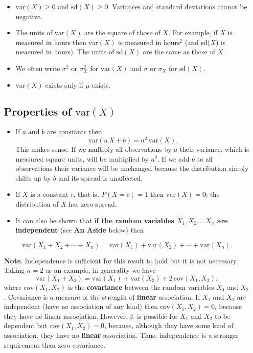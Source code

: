 \documentclass[
  british,
  11pt,
  openany, a4paper]{book}
\providecommand{\tightlist}{%
  \setlength{\itemsep}{0pt}\setlength{\parskip}{0pt}}
\begin{document}
\begin{itemize}
\tightlist
\item
  \(\mathrm{var}(X) \geq 0\) and \(\mathrm{sd}(X) \geq 0\). Variances and standard deviations cannot be negative.\\
\item
  The units of \(\mathrm{var}(X)\) are the square of those of \(X\). For example, if \(X\) is measured in hours then \(\mathrm{var}(X)\) is measured in hours\(^2\) (and sd(\(X\)) is measured in hours). The units of \(\mathrm{sd}(X)\) are the same as those of \(X\).
\item
  We often write \(\sigma^2\) or \(\sigma_X^2\) for \(\mathrm{var}(X)\) and
  \(\sigma\) or \(\sigma_X\) for \(\mathrm{sd}(X)\).
\item
  \(\mathrm{var}(X)\) exists only if \(\mu\) exists.
\end{itemize}

\subsection{\texorpdfstring{Properties of \(\mathrm{var}(X)\)}{Properties of \textbackslash mathrm\{var\}(X)}}\label{properties-of-mathrmvarx}

\begin{itemize}
\tightlist
\item
  If \(a\) and \(b\) are constants then
  \[ \mathrm{var}(a\,X+b) = a^2\,\mathrm{var}(X). \]
  This makes sense. If we multiply all observations by \(a\) their variance, which is measured square units, will be multiplied by \(a^2\). If we add \(b\) to all observations their variance will be unchanged because the distribution simply shifts up by \(b\) and its spread is unaffected.
\item
  If \(X\) is a constant \(c\), that is, \(P(X=c)=1\) then \(\mathrm{var}(X)=0\): the distribution of \(X\) has zero spread.
\item
  It can also be shown that \textbf{if the random variables \(X_1, X_2, \ldots X_n\) are independent} (see \textbf{An Aside} below) then
\end{itemize}

\begin{equation}
\mathrm{var}(X_1 + X_2 + \cdots + X_n) = \mathrm{var}(X_1) + \mathrm{var}(X_2) + \cdots + \mathrm{var}(X_n). 
\label{eq:varsum}
\end{equation}

\textbf{Note}. Independence is sufficient for this result to hold but it is not necessary. Taking \(n=2\) as an example, in generality we have
\[ \mathrm{var}(X_1 + X_2) = \mathrm{var}(X_1) + \mathrm{var}(X_2) + 2\,\mathrm{cov}(X_1,X_2), \]
where \(\mathrm{cov}(X_1,X_2)\) is the \textbf{covariance} between the random variables \(X_1\) and \(X_2\). Covariance is a measure of the strength of \textbf{linear} association. If \(X_1\) and \(X_2\) are independent (have no association of any kind) then \(\mathrm{cov}(X_1,X_2)=0\), because they have no linear association. However, it is possible for \(X_1\) and \(X_2\) to be dependent but \(\mathrm{cov}(X_1,X_2)=0\), because, although they have some kind of association, they have no \textbf{linear} association. Thus, independence is a stronger requirement than zero covariance.
\end{document}
